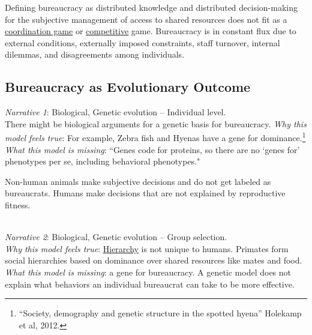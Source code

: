 Defining bureaucracy as distributed knowledge and distributed decision-making for the subjective management of access to shared resources does not fit as a \href{https://en.wikipedia.org/wiki/Coordination_game}{coordination game} 
or \href{https://en.wikipedia.org/wiki/Non-cooperative_game_theory}{competitive} game. 
Bureaucracy is in constant flux due to external conditions, externally imposed constraints, staff turnover, internal dilemmas, and disagreements among individuals. 

\subsection*{Bureaucracy as Evolutionary Outcome}

\textit{Narrative 1}: Biological, Genetic evolution -- Individual level. \\
There might be biological arguments for a genetic basis for bureaucracy. 
\textit{Why this model feels true}: For example, Zebra fish and Hyenas have a gene for dominance.\footnote{``Society, demography and genetic structure in the spotted hyena'' Holekamp et al,
2012.} \\
\textit{What this model is missing}: ``Genes code for proteins, so there are no `genes for' phenotypes per se, including behavioral phenotypes."~\cite{2015_Lilienfeld}

Non-human animals make subjective decisions and do not get labeled as bureaucrats. Humans make decisions that are not explained by reproductive fitness.

\ \\
\textit{Narrative 2}: Biological, Genetic evolution -- Group selection. \\
\textit{Why this model feels true}: \hyperref[sec:hierarchy-of-roles]{Hierarchy}
is not unique to humans. Primates form  social hierarchies based on dominance over shared resources like mates and food. \\
\textit{What this model is missing}: a gene for bureaucracy. A genetic model does not explain what behaviors an individual bureaucrat can take to be more effective. 

